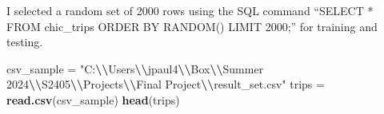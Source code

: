 \documentclass[
]{article}
\newenvironment{Shaded}{\begin{snugshade}}{\end{snugshade}}
\newcommand{\FunctionTok}[1]{\textcolor[rgb]{0.13,0.29,0.53}{\textbf{#1}}}
\newcommand{\NormalTok}[1]{#1}
\newcommand{\OtherTok}[1]{\textcolor[rgb]{0.56,0.35,0.01}{#1}}
\newcommand{\SpecialCharTok}[1]{\textcolor[rgb]{0.81,0.36,0.00}{\textbf{#1}}}
\newcommand{\StringTok}[1]{\textcolor[rgb]{0.31,0.60,0.02}{#1}}
\begin{document}
I selected a random set of 2000 rows using the SQL command ``SELECT *
FROM chic\_trips ORDER BY RANDOM() LIMIT 2000;'' for training and
testing.

\begin{Shaded}
\begin{Highlighting}[]
\NormalTok{csv\_sample }\OtherTok{=} \StringTok{"C:}\SpecialCharTok{\textbackslash{}\textbackslash{}}\StringTok{Users}\SpecialCharTok{\textbackslash{}\textbackslash{}}\StringTok{jpaul4}\SpecialCharTok{\textbackslash{}\textbackslash{}}\StringTok{Box}\SpecialCharTok{\textbackslash{}\textbackslash{}}\StringTok{Summer 2024}\SpecialCharTok{\textbackslash{}\textbackslash{}}\StringTok{S2405}\SpecialCharTok{\textbackslash{}\textbackslash{}}\StringTok{Projects}\SpecialCharTok{\textbackslash{}\textbackslash{}}\StringTok{Final Project}\SpecialCharTok{\textbackslash{}\textbackslash{}}\StringTok{result\_set.csv"}
\NormalTok{trips }\OtherTok{=} \FunctionTok{read.csv}\NormalTok{(csv\_sample)}
\FunctionTok{head}\NormalTok{(trips)}
\end{Highlighting}
\end{Shaded}
\end{document}
